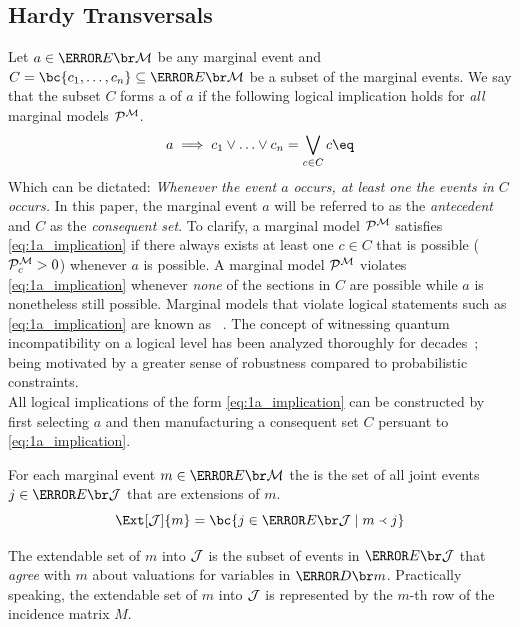 \documentclass[aps, 10pt, english, twoside, pra, nofootinbib, longbibliography]{revtex4-1}
\begin{document}
    \subsection{Hardy Transversals}
    \label{sec:logical_inequalities}
    Let $a \in \Events{\mscenario}$ be any marginal event and $C = \bc{c_1, \ldots, c_{n}} \subseteq \Events{\mscenario}$ be a subset of the marginal events. We say that the subset $C$ forms a  of $a$ if the following logical implication holds for \textit{all} marginal models $\probvec^{\mscenario}$.
    \[ a \implies c_1 \vee \ldots \vee c_n = \bigvee_{c \in C} c \eq \label{eq:1a_implication} \]
    Which can be dictated: \textit{Whenever the event $a$ occurs, at least one the events in $C$ occurs.} In this paper, the marginal event $a$ will be referred to as the \textit{antecedent} and $C$ as the \textit{consequent set}. To clarify, a marginal model $\probvec^{\mscenario}$ satisfies \cref{eq:1a_implication} if there always exists at least one $c \in C$ that is possible ($\probvec^{\mscenario}_c > 0$) whenever $a$ is possible. A marginal model $\probvec^{\mscenario}$ violates \cref{eq:1a_implication} whenever \textit{none} of the sections in $C$ are possible while $a$ is nonetheless still possible. Marginal models that violate logical statements such as \cref{eq:1a_implication} are known as ~\cite{Inflation,Mansfield_2012,Mancinska_2014}. The concept of witnessing quantum incompatibility on a logical level has been analyzed thoroughly for decades~\cite{Greenberger_1990,Abramsky_2012}; being motivated by a greater sense of robustness compared to probabilistic constraints. \\

    All logical implications of the form \cref{eq:1a_implication} can be constructed by first selecting $a$ and then manufacturing a consequent set $C$ persuant to \cref{eq:1a_implication}.

    \begin{definition}
        \label{def:extendable_set}
        For each marginal event $m \in \Events{\mscenario}$ the  is the set of all joint events $j \in \Events{\jointvar}$ that are extensions of $m$.
        \[ \Ext[\jointvar]{m} = \bc{j \in \Events{\jointvar} \mid m \ext j} \]
    \end{definition}

    The extendable set of $m$ into $\mathcal{J}$ is the subset of events in $\Events{\jointvar}$ that \textit{agree} with $m$ about valuations for variables in $\Dom{m}$. Practically speaking, the extendable set of $m$ into $\mathcal{J}$ is represented by the $m$-th row of the incidence matrix $M$.
\end{document}
